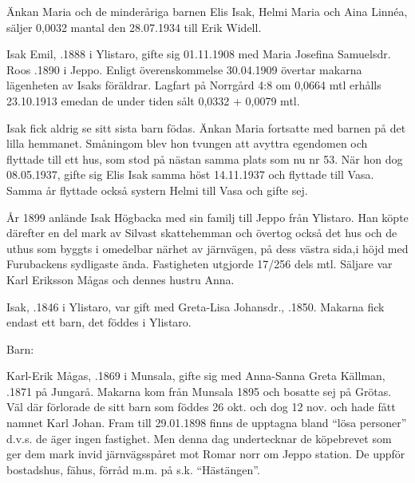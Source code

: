 Änkan Maria och de minderåriga barnen Elis Isak, Helmi Maria och Aina Linnéa, säljer 0,0032 mantal den 28.07.1934 till Erik Widell.\jhvspace{}


Isak Emil, .1888 i Ylistaro, gifte sig 01.11.1908 med Maria Josefina Samuelsdr. Roos .1890 i Jeppo. Enligt överenskommelse 30.04.1909 övertar makarna lägenheten av Isaks föräldrar. Lagfart på Norrgård 4:8 om 0,0664 mtl erhålls 23.10.1913 emedan de under tiden sålt 0,0332 + 0,0079 mtl.
\begin{jhchildren}
  \item {}
  \item {}
  \item {}
  \item {}
  \item {}
\end{jhchildren}
Isak fick aldrig se sitt sista barn födas. Änkan Maria fortsatte med barnen på det lilla hemmanet. Småningom blev hon tvungen att avyttra egendomen och flyttade till ett hus, som stod på nästan samma plats som nu nr 53. När hon dog 08.05.1937, gifte sig Elis Isak samma höst 14.11.1937 och flyttade till Vasa. Samma år flyttade också systern Helmi till Vasa och gifte sej.


År 1899 anlände Isak Högbacka med sin familj till Jeppo från Ylistaro. Han köpte därefter en del mark av Silvast skattehemman och övertog också det hus och de uthus som byggts i omedelbar närhet av järnvägen, på dess västra sida,i höjd med Furubackens sydligaste ända. Fastigheten utgjorde 17/256 dels mtl. Säljare var Karl Eriksson Mågas och dennes hustru Anna.

Isak, .1846 i Ylistaro, var gift med Greta-Lisa Johansdr., .1850. Makarna fick endast ett barn, det föddes i Ylistaro.

Barn: 


Karl-Erik Mågas, .1869 i Munsala, gifte sig med Anna-Sanna Greta Källman, .1871 på Jungarå. Makarna kom från Munsala 1895 och bosatte sej på Grötas. Väl där förlorade de sitt barn som föddes 26 okt. och dog 12 nov. och hade fått namnet Karl Johan. Fram till 29.01.1898 finns de upptagna bland ``lösa personer'' d.v.s. de äger ingen fastighet. Men denna dag undertecknar de köpebrevet som ger dem mark invid järnvägsspåret mot Romar norr om Jeppo station. De uppför bostadshus, fähus, förråd m.m. på s.k. ``Hästängen''.

